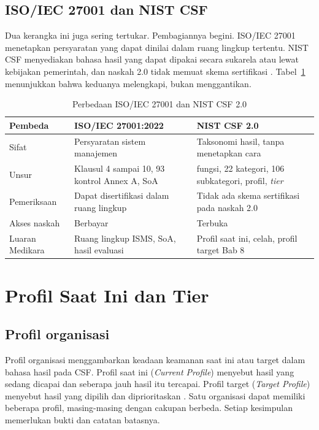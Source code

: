 \subsection*{ISO/IEC 27001 dan NIST CSF}

Dua kerangka ini juga sering tertukar. Pembagiannya begini. ISO/IEC 27001 menetapkan persyaratan yang
dapat dinilai dalam ruang lingkup tertentu. NIST CSF menyediakan bahasa hasil yang dapat dipakai
secara sukarela atau lewat kebijakan pemerintah, dan naskah 2.0 tidak memuat skema sertifikasi
\cite{nistcsf2}. Tabel~\ref{tab:ch06-iso-csf} menunjukkan bahwa keduanya melengkapi, bukan
menggantikan.

\begin{table}[!htb]
  \centering\small
  \caption{Perbedaan ISO/IEC 27001 dan NIST CSF 2.0}\label{tab:ch06-iso-csf}
  \begin{tabularx}{\textwidth}{|>{\raggedright\arraybackslash}p{}|>{\raggedright\arraybackslash}X|>{\raggedright\arraybackslash}X|}
    \hline
    \textbf{Pembeda} & \textbf{ISO/IEC 27001:2022} & \textbf{NIST CSF 2.0} \\ \hline
    Sifat & Persyaratan sistem manajemen & Taksonomi hasil, tanpa menetapkan cara \\ \hline
    Unsur & Klausul 4 sampai 10, 93 kontrol Annex A, SoA & 6 fungsi, 22 kategori, 106 subkategori,
    profil, \textit{tier} \\ \hline
    Pemeriksaan & Dapat disertifikasi dalam ruang lingkup & Tidak ada skema sertifikasi pada naskah
    2.0 \\ \hline
    Akses naskah & Berbayar & Terbuka \\ \hline
    Luaran Medikara & Ruang lingkup ISMS, SoA, hasil evaluasi & Profil saat ini, celah, profil target
    Bab 8 \\ \hline
  \end{tabularx}
\end{table}

\section{Profil Saat Ini dan Tier}

\subsection*{Profil organisasi}

Profil organisasi menggambarkan keadaan keamanan saat ini atau target dalam bahasa hasil pada CSF.
Profil saat ini (\textit{Current Profile}) menyebut hasil yang sedang dicapai dan seberapa jauh hasil
itu tercapai. Profil target (\textit{Target Profile}) menyebut hasil yang dipilih dan diprioritaskan
\cite{nistcsf2}. Satu organisasi dapat memiliki beberapa profil, masing-masing dengan cakupan berbeda.
Setiap kesimpulan memerlukan bukti dan catatan batasnya.

